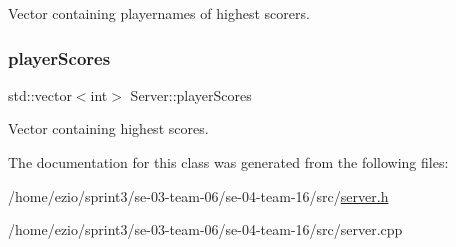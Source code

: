 Vector containing playernames of highest scorers. \mbox{\label{classServer_ae3bc58033f416d6bb1ff65e37b75fdc0}} 
\subsubsection{\texorpdfstring{player\+Scores}{playerScores}}
{\footnotesize\ttfamily std\+::vector$<$int$>$ Server\+::player\+Scores}

Vector containing highest scores. 

The documentation for this class was generated from the following files\+:\begin{DoxyCompactItemize}
\item 
/home/ezio/sprint3/se-\/03-\/team-\/06/se-\/04-\/team-\/16/src/\hyperlink{server_8h}{server.\+h}\item 
/home/ezio/sprint3/se-\/03-\/team-\/06/se-\/04-\/team-\/16/src/server.\+cpp\end{DoxyCompactItemize}
